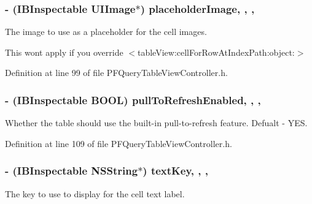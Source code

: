 \subsubsection[{placeholder\+Image}]{\setlength{\rightskip}{0pt plus 5cm}-\/ (I\+B\+Inspectable U\+I\+Image$\ast$) placeholder\+Image\hspace{0.3cm}{\ttfamily [read]}, {\ttfamily [write]}, {\ttfamily [nonatomic]}, {\ttfamily [strong]}}\label{interface_p_f_query_table_view_controller_a6e435ec43463857e02845f37174a342b}
The image to use as a placeholder for the cell images.

This won\textquotesingle{}t apply if you override $<$table\+View\+:cell\+For\+Row\+At\+Index\+Path\+:object\+:$>$ 

Definition at line 99 of file P\+F\+Query\+Table\+View\+Controller.\+h.

\hypertarget{interface_p_f_query_table_view_controller_ac6eea74d27530d3cc9e9b1b4ac5515ba}{}
\subsubsection[{pull\+To\+Refresh\+Enabled}]{\setlength{\rightskip}{0pt plus 5cm}-\/ (I\+B\+Inspectable B\+O\+O\+L) pull\+To\+Refresh\+Enabled\hspace{0.3cm}{\ttfamily [read]}, {\ttfamily [write]}, {\ttfamily [nonatomic]}, {\ttfamily [assign]}}\label{interface_p_f_query_table_view_controller_ac6eea74d27530d3cc9e9b1b4ac5515ba}
Whether the table should use the built-\/in pull-\/to-\/refresh feature. Defualt -\/ {\ttfamily Y\+E\+S}. 

Definition at line 109 of file P\+F\+Query\+Table\+View\+Controller.\+h.

\hypertarget{interface_p_f_query_table_view_controller_a8c8efe19f3ac20c048c82af0278d82b5}{}
\subsubsection[{text\+Key}]{\setlength{\rightskip}{0pt plus 5cm}-\/ (I\+B\+Inspectable N\+S\+String$\ast$) text\+Key\hspace{0.3cm}{\ttfamily [read]}, {\ttfamily [write]}, {\ttfamily [nonatomic]}, {\ttfamily [copy]}}\label{interface_p_f_query_table_view_controller_a8c8efe19f3ac20c048c82af0278d82b5}
The key to use to display for the cell text label.

